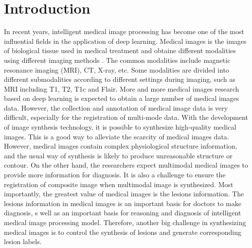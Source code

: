 \documentclass[runningheads]{llncs}
\begin{document}
\section{Introduction}
In recent years, intelligent medical image processing has become one of the most influential fields in the application of deep learning. Medical images is the images of biological tissue used in medical treatment and obtaine different modalities using different imaging methods . The common modalities include magnetic resonance imaging (MRI), CT, X-ray, etc. Some modalities are divided into different submodalities according to different settings during imaging, such as MRI including T1, T2, T1c and Flair.
More and more medical images research based on deep learning is expected to obtain a large number of medical images data. However, the collection and annotation of medical image data is very difficult, especially for the registration of multi-mode data. With the development of image synthesis technology, it is possible to synthesize high-quality medical images. This is a good way to alleviate the scarcity of medical images data.
However, medical images contain complex physiological structure information, and the usual way of synthesis is likely to produce unreasonable structure or contour. On the other hand, the researchers expect multimodal medical images to provide more information for diagnosis. It is also a challenge to ensure the registration of composite image when multimodal image is synthesized.
Most importantly, the greatest value of medical images is the lesions information. The lesions information in medical images is an important basis for doctors to make diagnosis, s well as an important basis for reasoning and diagnosis of intelligent medical image processing model. Therefore, another big challenge in synthesizing medical images is to control the synthesis of lesions and generate corresponding lesion labels.
\end{document}
